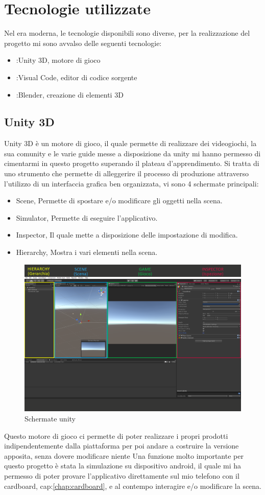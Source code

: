\documentclass[10pt,a4paper]{article}
\begin{document}
	\section{Tecnologie utilizzate}
	Nel era moderna, le tecnologie disponibili sono diverse, per la realizzazione del progetto mi sono avvalso delle seguenti tecnologie:
	\begin{itemize}
		\item:Unity 3D, motore di gioco
		\item:Visual Code, editor di codice sorgente
		\item:Blender, creazione di elementi 3D
	\end{itemize}
	\subsection{Unity 3D}\label{unity3D}
	Unity 3D è un motore di gioco, il quale permette di realizzare dei videogiochi, la sua comunity e le varie guide messe a disposizione da unity mi hanno permesso di cimentarmi in questo progetto superando il plateau d'apprendimento.
	Si tratta di uno strumento che permette di alleggerire il processo di produzione attraverso l'utilizzo di un interfaccia grafica ben organizzata, vi sono 4 schermate principali:
	\begin{itemize}
		\item Scene, Permette di spostare e/o modificare gli oggetti nella scena.
		\item Simulator, Permette di eseguire l'applicativo.
		\item Inspector, Il quale mette a disposizione delle impostazione di modifica.
		\item Hierarchy, Mostra i vari elementi nella scena.
	\end{itemize}
	\begin{figure}[H]
	\centering
	\includegraphics[width=0.7\linewidth]{image/unity}
	\caption{Schermate unity}
	\label{fig:unity}
\end{figure}
    Questo motore di gioco ci permette di poter realizzare i propri prodotti indipendentemente dalla piattaforma per poi andare a costruire la versione apposita, senza dovere modificare niente
    Una funzione molto importante per questo progetto è stata la simulazione su dispositivo android, il quale mi ha permesso di poter provare l'applicativo direttamente sul mio telefono con il cardboard, cap:\ref{chap:cardboard}, e al contempo interagire e/o modificare la scena.
\end{document}
